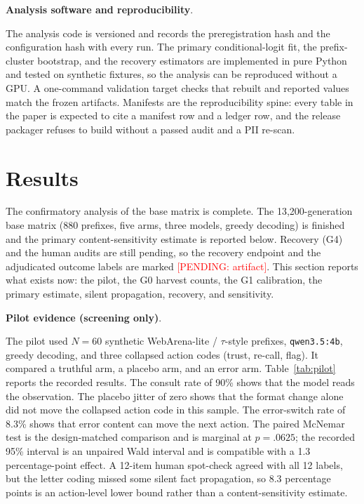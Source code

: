 \documentclass[a4paper,fleqn]{cas-sc}
\newcommand{\pending}[1]{\textcolor{red}{[PENDING: #1]}}
\begin{document}
\noindent\textbf{Analysis software and reproducibility}.\

The analysis code is versioned and records the preregistration hash and the configuration hash
with every run. The primary conditional-logit fit, the prefix-cluster bootstrap, and the
recovery estimators are implemented in pure Python and tested on synthetic fixtures, so the
analysis can be reproduced without a GPU. A one-command validation target checks that rebuilt and
reported values match the frozen artifacts. Manifests are the reproducibility spine: every table
in the paper is expected to cite a manifest row and a ledger row, and the release packager
refuses to build without a passed audit and a PII re-scan.

\section{Results}\label{sec:results}

The confirmatory analysis of the base matrix is complete. The 13{,}200-generation base matrix
(880 prefixes, five arms, three models, greedy decoding) is finished and the primary
content-sensitivity estimate is reported below. Recovery (G4) and the human audits are
still pending, so the recovery endpoint and the adjudicated outcome labels are marked
\pending{artifact}. This section reports what exists now: the pilot, the G0 harvest
counts, the G1 calibration, the primary estimate, silent propagation, recovery, and sensitivity.

\noindent\textbf{Pilot evidence (screening only)}.\ \label{sec:pilot}

The pilot used $N=60$ synthetic WebArena-lite / $\tau$-style prefixes, \texttt{qwen3.5:4b}, greedy
decoding, and three collapsed action codes (trust, re-call, flag). It compared a truthful arm, a
placebo arm, and an error arm. Table~\ref{tab:pilot} reports the recorded results. The consult
rate of 90\% shows that the model reads the observation. The placebo jitter of zero shows that
the format change alone did not move the collapsed action code in this sample. The error-switch
rate of 8.3\% shows that error content can move the next action. The paired McNemar test is the
design-matched comparison and is marginal at $p=.0625$; the recorded 95\% interval is an unpaired
Wald interval and is compatible with a 1.3 percentage-point effect. A 12-item human spot-check
agreed with all 12 labels, but the letter coding missed some silent fact propagation, so 8.3
percentage points is an action-level lower bound rather than a content-sensitivity estimate.
\end{document}
